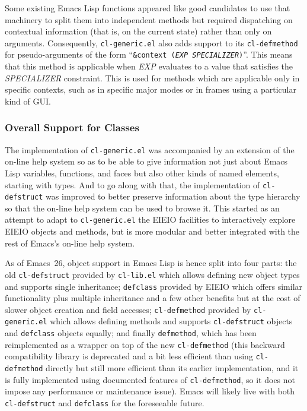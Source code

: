 \documentclass[format=acmsmall,screen]{acmart}
\newcommand \Elisp {Emacs Lisp}
\newcommand \id[1] {\textrm{\textsl{#1}}}
\begin{document}
Some existing \Elisp{} functions appeared like good candidates to use that
machinery to split them into independent methods but required dispatching
on contextual information (that is, on the current state) rather than only on
arguments.  Consequently, \texttt{cl-generic.el} also adds support to its
\texttt{cl-defmethod} for pseudo-arguments of the form ``\texttt{\&context
  (\id{EXP} \id{SPECIALIZER})}''. This means that this method is
applicable when \id{EXP} evaluates to a value that satisfies the
\id{SPECIALIZER} constraint.  This is used for methods which
are applicable only in specific contexts, such as in specific major modes or
in frames using a particular kind of GUI.

\subsubsection{Overall Support for Classes}

The implementation of \texttt{cl-generic.el} was accompanied by an extension
of the on-line help system so as to be able to give information not just
about \Elisp{} variables, functions, and faces but also other kinds of named
elements, starting with types.  And to go along with that, the implementation
of \texttt{cl-defstruct} was improved to better preserve information about
the type hierarchy so that the on-line help system can be used to browse
it.  This started as an attempt to adapt to \texttt{cl-generic.el} the EIEIO
facilities to interactively explore EIEIO objects and methods, but is more
modular and better integrated with the rest of Emacs's on-line help system.

As of Emacs~26, object support in \Elisp{} is hence split into four parts: the
old \texttt{cl-defstruct} provided by \texttt{cl-lib.el} which allows
defining new object types and supports single inheritance; \texttt{defclass}
provided by EIEIO which offers similar functionality plus multiple
inheritance and a few other benefits but at the cost of slower object
creation and field accesses; \texttt{cl-defmethod} provided by
\texttt{cl-generic.el} which allows defining methods and supports
\texttt{cl-defstruct} objects and \texttt{defclass} objects equally; and finally
\texttt{defmethod}, which
has been reimplemented as a wrapper on top of the new \texttt{cl-defmethod}
(this backward compatibility library is deprecated and a bit less efficient
than using \texttt{cl-defmethod} directly but still more efficient than its
earlier implementation, and it is fully implemented using documented features
of \texttt{cl-defmethod}, so it does not impose any performance or
maintenance issue).  Emacs will likely live with both \texttt{cl-defstruct} and
\texttt{defclass} for the foreseeable future.
\end{document}
